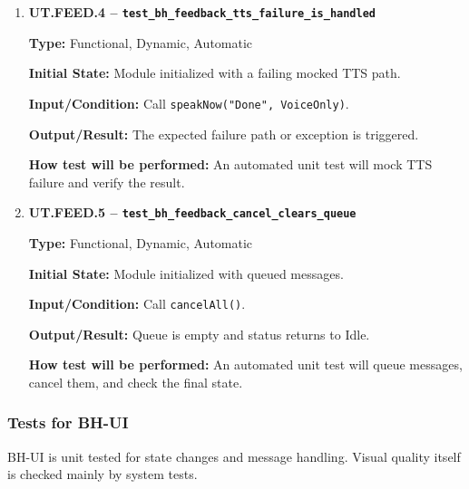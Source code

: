 \documentclass[12pt, titlepage]{article}
\begin{document}
\begin{enumerate}
\item \textbf{UT.FEED.4 --
\texttt{test\_bh\_feedback\_tts\_failure\_is\_handled}}

\textbf{Type:} Functional, Dynamic, Automatic

\textbf{Initial State:} Module initialized with a failing mocked TTS path.

\textbf{Input/Condition:} Call \texttt{speakNow("Done", VoiceOnly)}.

\textbf{Output/Result:} The expected failure path or exception is triggered.

\textbf{How test will be performed:} An automated unit test will mock TTS
failure and verify the result.

\item \textbf{UT.FEED.5 --
\texttt{test\_bh\_feedback\_cancel\_clears\_queue}}

\textbf{Type:} Functional, Dynamic, Automatic

\textbf{Initial State:} Module initialized with queued messages.

\textbf{Input/Condition:} Call \texttt{cancelAll()}.

\textbf{Output/Result:} Queue is empty and status returns to Idle.

\textbf{How test will be performed:} An automated unit test will queue
messages, cancel them, and check the final state.

\end{enumerate}

\subsubsection{Tests for BH-UI}

BH-UI is unit tested for state changes and message handling. Visual
quality itself is checked mainly by system tests.
\end{document}
